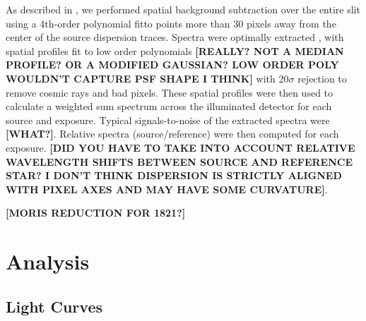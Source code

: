 \documentclass[twocolumn]{aastex6}
\begin{document}
As described in \citet{2016ApJ...826..156S}, we performed spatial background subtraction over the entire slit using a 4th-order polynomial fitto points more than 30 pixels away from the center of the source dispersion traces.  Spectra were optimally extracted \citep{1986ApJ...302..757H}, with spatial profiles fit to low order polynomials {\bf [REALLY? NOT A MEDIAN PROFILE? OR A MODIFIED GAUSSIAN? LOW ORDER POLY WOULDN'T CAPTURE PSF SHAPE I THINK]} with 20$\sigma$ rejection to remove cosmic rays and bad pixels.
These spatial profiles were then used to calculate a weighted sum spectrum across the illuminated detector for each source and exposure. 
Typical signals-to-noise of the extracted spectra were {\bf [WHAT?]}. 
Relative spectra (source/reference) were then computed for each exposure. {\bf [DID YOU HAVE TO TAKE INTO ACCOUNT RELATIVE WAVELENGTH SHIFTS BETWEEN SOURCE AND REFERENCE STAR? I DON'T THINK DISPERSION IS STRICTLY ALIGNED WITH PIXEL AXES AND MAY HAVE SOME CURVATURE]}.

{\bf [MORIS REDUCTION FOR 1821?]}

\section{Analysis}

\subsection{Light Curves}
\end{document}
